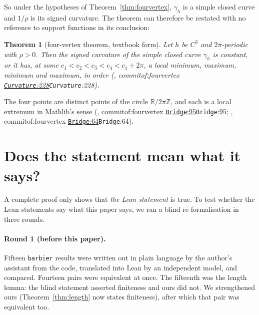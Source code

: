 \documentclass[11pt]{article}
\newtheorem{theorem}{Theorem}
\theoremstyle{definition}
\theoremstyle{remark}
\newcommand{\lean}[1]{\texttt{#1}}
\newcommand{\RR}{\mathbb{R}}
\newcommand{\commitof}[1]{\csname commitof:#1\endcsname}
\newcommand{\repo}[1]{https://github.com/jpbald93/#1}
\newcommand{\src}[4]{\ifcsname commitof:#1\endcsname
  \href{\repo{#1}/blob/\commitof{#1}/#2/#3.lean\#L#4}{\texttt{#3}:#4}\else\texttt{#3}:#4\fi}
\begin{document}
So under the hypotheses of Theorem~\ref{thm:fourvertex}, $\gamma_h$ is a simple closed curve and
$1/\rho$ is its signed curvature. The theorem can therefore be restated with no reference to
support functions in its conclusion:

\begin{theorem}[four-vertex theorem, textbook form]\label{thm:fvtextbook}
Let $h$ be $C^3$ and $2\pi$-periodic with $\rho>0$. Then the signed curvature of the simple closed
curve $\gamma_h$ is constant, or it has, at some $c_1<c_2<c_3<c_4<c_1+2\pi$, a local minimum, maximum,
minimum and maximum, in order (, \src{fourvertex}{FourVertex}{Curvature}{228}).
\end{theorem}

The four points are distinct points of the circle $\RR/2\pi\mathbb{Z}$, and each is a local extremum
in Mathlib's sense (, \src{fourvertex}{FourVertex}{Bridge}{95};
, \src{fourvertex}{FourVertex}{Bridge}{64}).

\section{Does the statement mean what it says?}\label{sec:blind}

A complete proof only shows that \emph{the Lean statement} is true. To test whether the Lean
statements say what this paper says, we ran a blind re-formalisation in three rounds.

\paragraph{Round 1 (before this paper).} Fifteen \lean{barbier} results were written out in plain
language by the author's assistant from the code, translated into Lean by an independent model, and
compared. Fourteen pairs were equivalent at once. The fifteenth was the length lemma: the blind
statement asserted finiteness and ours did not. We strengthened ours (Theorem~\ref{thm:length} now
states finiteness), after which that pair was equivalent too.
\end{document}
